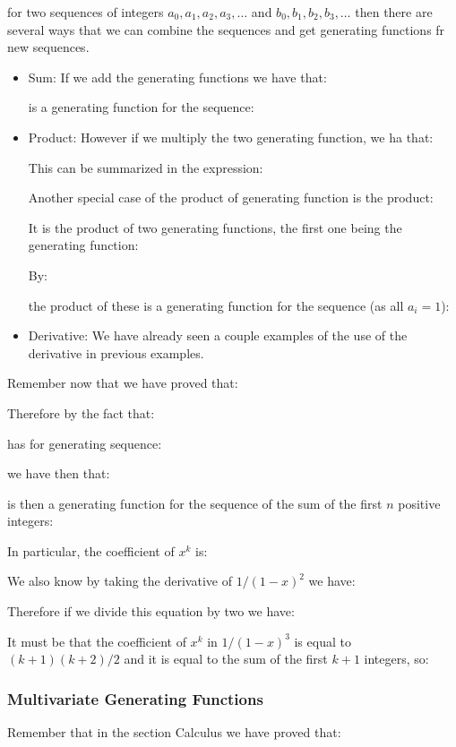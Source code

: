 	for two sequences of integers $a_0,a_1,a_2,a_3,\ldots$ and $b_0,b_1,b_2,b_3,\ldots$ then there are several ways that we can combine the sequences and get generating functions fr new sequences.

	\begin{itemize}
		\item Sum: If we add the generating functions we have that:
		
		is a generating function for the sequence:
		
		
		\item Product: However if we multiply the two generating function, we ha that:
		
		This can be summarized in the expression:
		
		Another special case of the product of generating function is the product:
		
		It is the product of two generating functions, the first one being the generating function:
		
		By:
		
		the product of these is a generating function for the sequence (as all $a_i=1$):
		
	
		\item Derivative: We have already seen a couple examples of the
use of the derivative in previous examples.
	\end{itemize}
	Remember now that we have proved that:
	
	Therefore by the fact that:
	
	has for generating sequence:
	
	we have then that:
	
	is then a generating function for the sequence of the sum of the first $n$ positive integers:
	
	In particular, the coefficient of $x^k$ is:
	
	We also know by taking the derivative of $1/(1-x)^2$ we have:
	
	Therefore if we divide this equation by two we have:
	
	It must be that the coefficient of $x^k$ in $1/(1-x)^3$ is equal to $(k + 1)(k + 2)/2$ and it is equal to the sum of the first $k+1$ integers, so:
	
	
	\subsubsection{Multivariate Generating Functions}
	Remember that in the section Calculus we have proved that:
	
